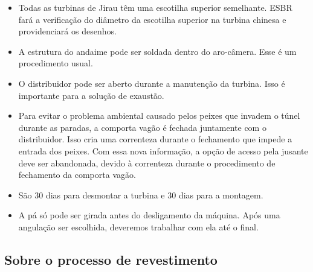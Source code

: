 \documentclass[12pt,a4paper]{article}
\begin{document}
\begin{itemize}
  \item Todas as turbinas de Jirau têm uma escotilha superior semelhante. ESBR
  fará a verificação do diâmetro da escotilha superior na turbina chinesa e providenciará os desenhos.

  \item A estrutura do andaime pode ser soldada dentro do aro-câmera. Esse é um procedimento usual.
  
  \item O distribuidor pode ser aberto durante a manutenção da turbina. Isso é
  importante para a solução de exaustão.
  
  \item Para evitar o problema ambiental causado pelos peixes que invadem o
  túnel durante as paradas, a comporta vagão é fechada juntamente com o
  distribuidor. Isso cria uma correnteza durante o fechamento que impede a
  entrada dos peixes. Com essa nova informação, a opção de acesso pela
  jusante deve ser abandonada, devido à correnteza durante o procedimento de
  fechamento da comporta vagão.
  
  \item São 30 dias para desmontar a turbina e 30 dias para a montagem.
  
  \item A pá só pode ser girada antes do desligamento da máquina. Após uma
  angulação ser escolhida, deveremos trabalhar com ela até o final.

\end{itemize}

\subsection{Sobre o processo de revestimento}
\end{document}
